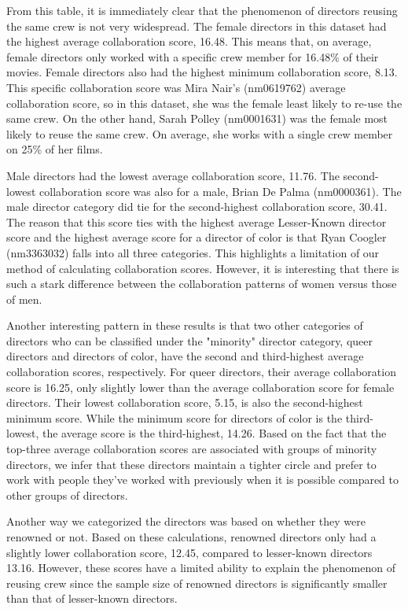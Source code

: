 \documentclass[12pt]{article}
\begin{document}
From this table, it is immediately clear that the phenomenon of directors reusing the same crew is not very widespread. The female directors in this dataset had the highest average collaboration score, 16.48. This means that, on average, female directors only worked with a specific crew member for 16.48\% of their movies. Female directors also had the highest minimum collaboration score, 8.13. This specific collaboration score was Mira Nair's (nm0619762) average collaboration score, so in this dataset, she was the female least likely to re-use the same crew. On the other hand, Sarah Polley (nm0001631) was the female most likely to reuse the same crew. On average, she works with a single crew member on 25\% of her films.
\par
Male directors had the lowest average collaboration score, 11.76. The second-lowest collaboration score was also for a male, Brian De Palma (nm0000361). The male director category did tie for the second-highest collaboration score, 30.41. The reason that this score ties with the highest average Lesser-Known director score and the highest average score for a director of color is that Ryan Coogler (nm3363032) falls into all three categories. This highlights a limitation of our method of calculating collaboration scores. However, it is interesting that there is such a stark difference between the collaboration patterns of women versus those of men.
\par
Another interesting pattern in these results is that two other categories of directors who can be classified under the "minority" director category, queer directors and directors of color, have the second and third-highest average collaboration scores, respectively. For queer directors, their average collaboration score is 16.25, only slightly lower than the average collaboration score for female directors. Their lowest collaboration score, 5.15, is also the second-highest minimum score. While the minimum score for directors of color is the third-lowest, the average score is the third-highest, 14.26. Based on the fact that the top-three average collaboration scores are associated with groups of minority directors, we infer that these directors maintain a tighter circle and prefer to work with people they've worked with previously when it is possible compared to other groups of directors.
\par
Another way we categorized the directors was based on whether they were renowned or not. Based on these calculations, renowned directors only had a slightly lower collaboration score, 12.45, compared to lesser-known directors 13.16. However, these scores have a limited ability to explain the phenomenon of reusing crew since the sample size of renowned directors is significantly smaller than that of lesser-known directors. 
\end{document}
